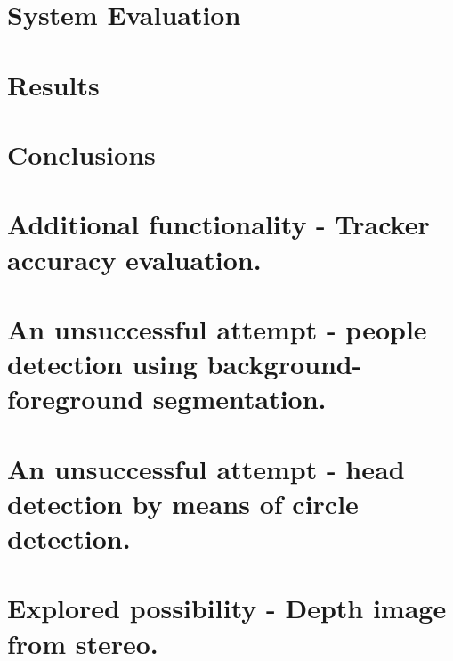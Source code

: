 \documentclass[10pt, a4paper, twoside]{article}
\numberwithin{equation}{subsection}
\numberwithin{figure}{section}
\numberwithin{table}{section}
\begin{document}
\newpage
\section{System Evaluation}
\label{sec:evaluation}


\newpage
\section{Results}
\label{sec:results}


\newpage
\section{Conclusions}
\label{sec:conclusions}


\newpage
\appendix
{} %

\section{Additional functionality - Tracker accuracy evaluation.}
\label{sec:tracker_evaluation}

\newpage

\section{An unsuccessful attempt - people detection using background-foreground segmentation.}
\label{sec:bg_subtraction}

\newpage

\section{An unsuccessful attempt - head detection by means of circle detection.}
\label{sec:hough_circles}

\newpage

\section{Explored possibility - Depth image from stereo.}
\label{sec:stereoBM}

\newpage

%
%

\thispagestyle{fancy}
\mbox{}

\end{document}
